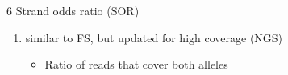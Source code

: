 \documentclass[t,10pt]{beamer}
\begin{document}
\begin{frame}[label={sec:orgheadline13}]{6 Strand odds ratio (SOR)}
\begin{enumerate}
\item similar to FS, but updated for high coverage (NGS)   
\begin{itemize}
\item Ratio of reads that cover both alleles
\end{itemize}
\end{enumerate}
\end{frame}
\end{document}
